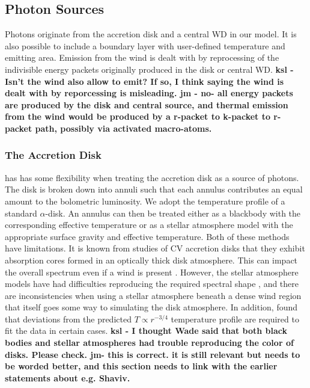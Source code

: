 \documentclass[preprint, a4paper, 11pt]{aastex}
\begin{document}
{\subsection{Photon Sources}

Photons originate from the accretion disk and a central WD in our model. It is also possible to include
a boundary layer with user-defined temperature and emitting area. Emission from the wind is dealt with
by reprocessing of the indivisible energy packets originally produced in the disk or central WD. 
{\bf ksl -Isn't the wind also allow to emit?  If so, I think saying the wind is dealt with by reporcessing is misleading.
jm - no- all energy packets are produced by the disk and central source, and thermal emission from 
the wind would be produced by a r-packet to k-packet to r-packet path, possibly via activated macro-atoms.}

\subsubsection{The Accretion Disk}

\py has has some flexibility when treating the accretion disk as a source of photons. 
The disk is broken down into annuli 
such that each annulus contributes an equal amount to the bolometric luminosity. 
We adopt the temperature profile of a standard \cite{shakurasunyaev1973} $\alpha$-disk.
An annulus can then
be treated either as a blackbody with the corresponding effective temperature or as a stellar atmosphere model
with the appropriate surface gravity and effective temperature. 
Both of these methods have limitations. It is known
from studies of CV accretion disks that they exhibit absorption cores 
formed in an optically thick disk atmosphere.
This can impact the overall spectrum even if a wind is present 
\citep[see e.g.][]{dhillon1996}.
However, the stellar atmosphere models
have had difficulties reproducing the required spectral shape \citep{wade1988}, 
and there are inconsistencies when using a 
stellar atmosphere beneath a dense
wind region that itself goes some way to simulating the disk atmosphere. 
In addition, \cite{linnell2010} found that deviations from the predicted 
$T\propto r^{-3/4}$ temperature profile are required to fit the data
in certain cases.  {\bf ksl - I thought Wade said that both black bodies and stellar atmospheres had trouble reproducing the color of disks.  Please check. jm- this is correct. it is still relevant but needs to be worded better,
and this section needs to link with the earlier statements about e.g. Shaviv.}

}
\end{document}
